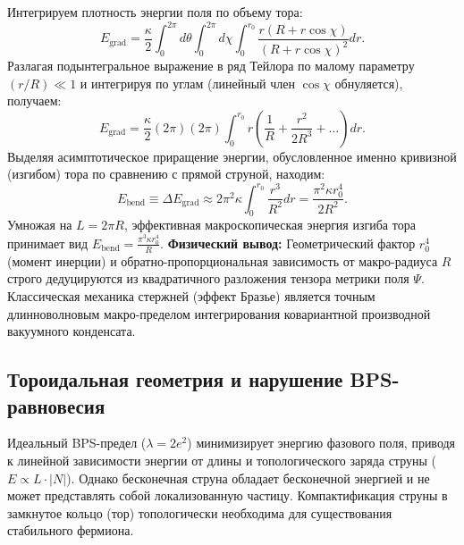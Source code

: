 \documentclass[12pt,a4paper]{article}
\begin{document}
Интегрируем плотность энергии поля по объему тора:
\begin{equation}
E_{\text{grad}} = \frac{\kappa}{2} \int_0^{2\pi} d\theta \int_0^{2\pi} d\chi \int_0^{r_0} \frac{r(R + r\cos\chi)}{(R + r\cos\chi)^2} dr.
\end{equation}
Разлагая подынтегральное выражение в ряд Тейлора по малому параметру $(r/R) \ll 1$ и интегрируя по углам (линейный член $\cos\chi$ обнуляется), получаем:
\begin{equation}
E_{\text{grad}} = \frac{\kappa}{2} (2\pi) (2\pi) \int_0^{r_0} r \left( \frac{1}{R} + \frac{r^2}{2R^3} + \dots \right) dr.
\end{equation}
Выделяя асимптотическое приращение энергии, обусловленное именно кривизной (изгибом) тора по сравнению с прямой струной, находим:
\begin{equation}
E_{\text{bend}} \equiv \Delta E_{\text{grad}} \approx 2\pi^2 \kappa \int_0^{r_0} \frac{r^3}{R^2} dr = \frac{\pi^2 \kappa r_0^4}{2 R^2}.
\label{eq:field_to_mechanics}
\end{equation}
Умножая на $L = 2\pi R$, эффективная макроскопическая энергия изгиба тора принимает вид $E_{\text{bend}} = \frac{\pi^3 \kappa r_0^4}{R}$.
\textbf{Физический вывод:} Геометрический фактор $r_0^4$ (момент инерции) и обратно-пропорциональная зависимость от макро-радиуса $R$ строго дедуцируются из квадратичного разложения тензора метрики поля $\Psi$. Классическая механика стержней (эффект Бразье) является точным длинноволновым макро-пределом интегрирования ковариантной производной вакуумного конденсата.
	
\subsection{Тороидальная геометрия и нарушение BPS-равновесия}
Идеальный BPS-предел ($\lambda = 2e^2$) минимизирует энергию фазового поля, приводя к линейной зависимости энергии от длины и топологического заряда струны ($E \propto L \cdot |N|$). Однако бесконечная струна обладает бесконечной энергией и не может представлять собой локализованную частицу. Компактификация струны в замкнутое кольцо (тор) топологически необходима для существования стабильного фермиона.
	
\end{document}
